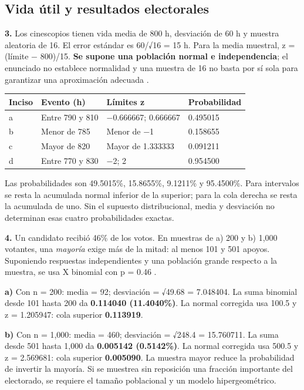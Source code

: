 {\clearpage
\subsection{Vida útil y resultados electorales}
\textbf{3.} Los cinescopios tienen vida media de 800 h, desviación de 60 h y muestra aleatoria de 16. El error estándar es 60/√16 = 15 h. Para la media muestral, z = (límite − 800)/15. \textbf{Se supone una población normal e independencia}; el enunciado no establece normalidad y una muestra de 16 no basta por sí sola para garantizar una aproximación adecuada \citep{holmesBusiness2023}.

\begin{center}
\begin{tabular}{llll}
\textbf{Inciso} & \textbf{Evento (h)} & \textbf{Límites z} & \textbf{Probabilidad}\\\hline
a & Entre 790 y 810 & −0.666667; 0.666667 & 0.495015\\
b & Menor de 785 & Menor de −1 & 0.158655\\
c & Mayor de 820 & Mayor de 1.333333 & 0.091211\\
d & Entre 770 y 830 & −2; 2 & 0.954500\\
\end{tabular}
\end{center}

Las probabilidades son 49.5015\%, 15.8655\%, 9.1211\% y 95.4500\%. Para intervalos se resta la acumulada normal inferior de la superior; para la cola derecha se resta la acumulada de uno. Sin el supuesto distribucional, media y desviación no determinan esas cuatro probabilidades exactas.

\textbf{4.} Un candidato recibió 46\% de los votos. En muestras de a) 200 y b) 1,000 votantes, una \textit{mayoría} exige más de la mitad: al menos 101 y 501 apoyos. Suponiendo respuestas independientes y una población grande respecto a la muestra, se usa X binomial con p = 0.46 \citep{holmesBusiness2023}.

\textbf{a)} Con n = 200: media = 92; desviación = √49.68 = 7.048404. La suma binomial desde 101 hasta 200 da \textbf{0.114040 (11.4040\%)}. La normal corregida usa 100.5 y z = 1.205947: cola superior \textbf{0.113919}.

\textbf{b)} Con n = 1,000: media = 460; desviación = √248.4 = 15.760711. La suma desde 501 hasta 1,000 da \textbf{0.005142 (0.5142\%)}. La normal corregida usa 500.5 y z = 2.569681: cola superior \textbf{0.005090}. La muestra mayor reduce la probabilidad de invertir la mayoría. Si se muestrea sin reposición una fracción importante del electorado, se requiere el tamaño poblacional y un modelo hipergeométrico.

}
